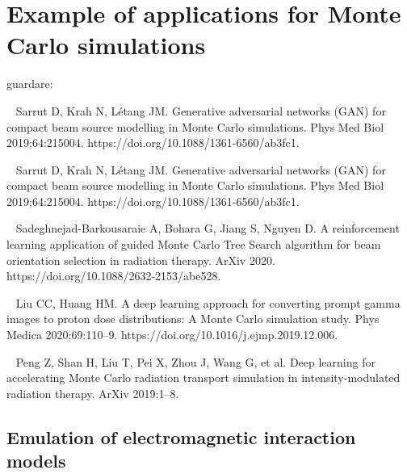 \section{Example of applications for Monte Carlo simulations}
\label{sec:examples}


guardare:

~\cite{Sarrut2018} Sarrut D, Krah N, Létang JM. Generative adversarial networks (GAN) for compact beam source modelling in Monte Carlo simulations. Phys Med Biol 2019;64:215004. https://doi.org/10.1088/1361-6560/ab3fc1.

~\cite{Sarrut2019}
Sarrut D, Krah N, Létang JM. Generative adversarial networks (GAN) for compact beam source modelling in Monte Carlo simulations. Phys Med Biol 2019;64:215004. https://doi.org/10.1088/1361-6560/ab3fc1.

~\cite{Sadeghnejad-Barkousaraie2020}
Sadeghnejad-Barkousaraie A, Bohara G, Jiang S, Nguyen D. A reinforcement learning application of guided Monte Carlo Tree Search algorithm for beam orientation selection in radiation therapy. ArXiv 2020. https://doi.org/10.1088/2632-2153/abe528.

~\cite{Liu2020a} 
Liu CC, Huang HM. A deep learning approach for converting prompt gamma images to proton dose distributions: A Monte Carlo simulation study. Phys Medica 2020;69:110–9. https://doi.org/10.1016/j.ejmp.2019.12.006.

~\cite{Peng2019}
Peng Z, Shan H, Liu T, Pei X, Zhou J, Wang G, et al. Deep learning for accelerating Monte Carlo radiation transport simulation in intensity-modulated radiation therapy. ArXiv 2019:1–8.

\subsection{Emulation of electromagnetic interaction models}




